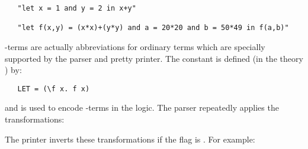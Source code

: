 \begin{hol}\begin{verbatim}
   "let x = 1 and y = 2 in x+y"

   "let f(x,y) = (x*x)+(y*y) and a = 20*20 and b = 50*49 in f(a,b)"
\end{verbatim}\end{hol}

-terms are actually abbreviations for ordinary  terms which are
specially supported by the parser and pretty printer.
The constant  is defined (in the theory ) by:

\begin{hol}
\begin{verbatim}
   LET = (\f x. f x)
\end{verbatim}\end{hol}

\noindent and is used to encode -terms in the logic. The parser
repeatedly applies the transformations:

\bigskip

\noindent
{\small{}}

\bigskip


\noindent The printer inverts these transformations if the flag
 is .  For example:

